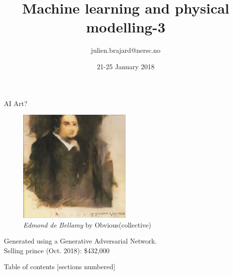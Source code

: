 \documentclass[handout]{beamer}
\title[Machine Learning]{Machine learning and physical modelling-3}
\author[J. Brajard]{julien.brajard@nersc.no}
\institute[NERSC/SU]{NERSC/Sorbonne University\\
\url{https://github.com/brajard/Geilo-Winter-school}}
\date{21-25 January 2018}
\begin{document}
\begin{frame}
\titlepage
\end{frame}

\begin{frame}{AI Art?}
    \begin{figure}
        \centering
        \includegraphics[width=0.5\textwidth]{fig/L3/478px-Edmond_de_Belamy.png}
        \caption*{\textit{Edmond de Bellamy} by Obvious(collective)}
    \end{figure}
    Generated using a Generative Adversarial Network.\\
    Selling prince (Oct. 2018): \$432,000
\end{frame}

\begin{frame}{Table of contents}
  [sections numbered]
  \tableofcontents[hideallsubsections]
\end{frame}
\end{document}
